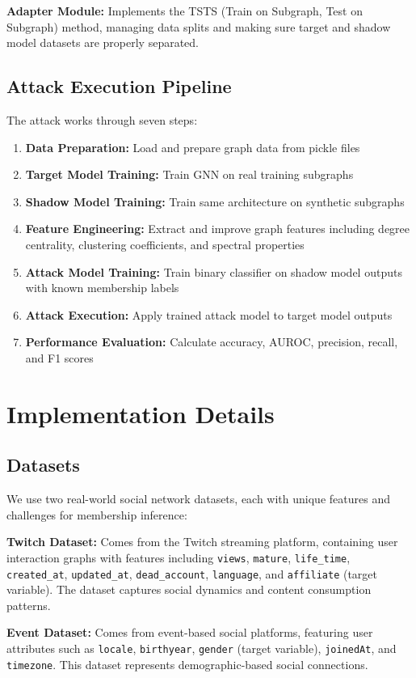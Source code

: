 \documentclass{article}
\begin{document}
\textbf{Adapter Module:} Implements the TSTS (Train on Subgraph, Test on Subgraph) method, managing data splits and making sure target and shadow model datasets are properly separated.

\subsection{Attack Execution Pipeline}
The attack works through seven steps:
\begin{enumerate}
\item \textbf{Data Preparation:} Load and prepare graph data from pickle files
\item \textbf{Target Model Training:} Train GNN on real training subgraphs
\item \textbf{Shadow Model Training:} Train same architecture on synthetic subgraphs
\item \textbf{Feature Engineering:} Extract and improve graph features including degree centrality, clustering coefficients, and spectral properties
\item \textbf{Attack Model Training:} Train binary classifier on shadow model outputs with known membership labels
\item \textbf{Attack Execution:} Apply trained attack model to target model outputs
\item \textbf{Performance Evaluation:} Calculate accuracy, AUROC, precision, recall, and F1 scores
\end{enumerate} 

\section{Implementation Details}
\subsection{Datasets}
We use two real-world social network datasets, each with unique features and challenges for membership inference:

\textbf{Twitch Dataset:} Comes from the Twitch streaming platform, containing user interaction graphs with features including \texttt{views}, \texttt{mature}, \texttt{life\_time}, \texttt{created\_at}, \texttt{updated\_at}, \texttt{dead\_account}, \texttt{language}, and \texttt{affiliate} (target variable). The dataset captures social dynamics and content consumption patterns.

\textbf{Event Dataset:} Comes from event-based social platforms, featuring user attributes such as \texttt{locale}, \texttt{birthyear}, \texttt{gender} (target variable), \texttt{joinedAt}, and \texttt{timezone}. This dataset represents demographic-based social connections.
\end{document}
